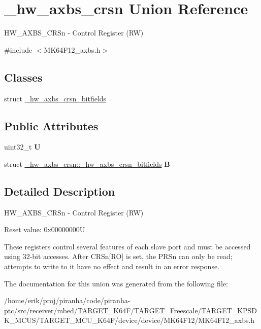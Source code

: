 \hypertarget{union__hw__axbs__crsn}{}\section{\+\_\+hw\+\_\+axbs\+\_\+crsn Union Reference}
\label{union__hw__axbs__crsn}


H\+W\+\_\+\+A\+X\+B\+S\+\_\+\+C\+R\+Sn -\/ Control Register (RW)  




{\ttfamily \#include $<$M\+K64\+F12\+\_\+axbs.\+h$>$}

\subsection*{Classes}
\begin{DoxyCompactItemize}
\item 
struct \hyperlink{struct__hw__axbs__crsn_1_1__hw__axbs__crsn__bitfields}{\+\_\+hw\+\_\+axbs\+\_\+crsn\+\_\+bitfields}
\end{DoxyCompactItemize}
\subsection*{Public Attributes}
\begin{DoxyCompactItemize}
\item 
uint32\+\_\+t {\bfseries U}\hypertarget{union__hw__axbs__crsn_a17c362051174fdb92ba83bca709eb688}{}\label{union__hw__axbs__crsn_a17c362051174fdb92ba83bca709eb688}

\item 
struct \hyperlink{struct__hw__axbs__crsn_1_1__hw__axbs__crsn__bitfields}{\+\_\+hw\+\_\+axbs\+\_\+crsn\+::\+\_\+hw\+\_\+axbs\+\_\+crsn\+\_\+bitfields} {\bfseries B}\hypertarget{union__hw__axbs__crsn_a44570800aaded250f9113cfd1f5399fb}{}\label{union__hw__axbs__crsn_a44570800aaded250f9113cfd1f5399fb}

\end{DoxyCompactItemize}


\subsection{Detailed Description}
H\+W\+\_\+\+A\+X\+B\+S\+\_\+\+C\+R\+Sn -\/ Control Register (RW) 

Reset value\+: 0x00000000U

These registers control several features of each slave port and must be accessed using 32-\/bit accesses. After C\+R\+Sn\mbox{[}RO\mbox{]} is set, the P\+R\+Sn can only be read; attempts to write to it have no effect and result in an error response. 

The documentation for this union was generated from the following file\+:\begin{DoxyCompactItemize}
\item 
/home/erik/proj/piranha/code/piranha-\/ptc/src/receiver/mbed/\+T\+A\+R\+G\+E\+T\+\_\+\+K64\+F/\+T\+A\+R\+G\+E\+T\+\_\+\+Freescale/\+T\+A\+R\+G\+E\+T\+\_\+\+K\+P\+S\+D\+K\+\_\+\+M\+C\+U\+S/\+T\+A\+R\+G\+E\+T\+\_\+\+M\+C\+U\+\_\+\+K64\+F/device/device/\+M\+K64\+F12/M\+K64\+F12\+\_\+axbs.\+h\end{DoxyCompactItemize}
